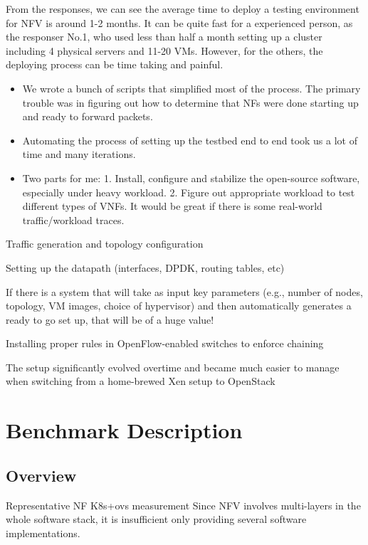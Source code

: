 \documentclass{sig-alternate-10pt}
\begin{document}
From the responses, we can see the average time 
to deploy a testing environment for NFV is around 1-2 months.
It can be quite fast for a experienced person, 
as the responser No.1, who used less than half a month 
setting up a cluster including 4 physical servers and 11-20 VMs. 
However, for the others, the deploying process 
can be time taking and painful.

\begin{itemize}
\item[]{}
We wrote a bunch of scripts that simplified most of the process. The primary trouble was in figuring out how to determine that NFs were done starting up and ready to forward packets.
\end{itemize}


\begin{itemize}
\item[]{}
Automating the process of setting up the testbed end to end took us a lot of time and many iterations.
\end{itemize}


\begin{itemize}
\item[]{}
Two parts for me:
1. Install, configure and stabilize the open-source software, especially under heavy workload.
2. Figure out appropriate workload to test different types of VNFs. It would be great if there is some real-world traffic/workload traces.
\end{itemize}

Traffic generation and topology configuration

Setting up the datapath (interfaces, DPDK, routing tables, etc)

If there is a system that will take as input key parameters (e.g., number of nodes, topology, VM images, choice of hypervisor) and then automatically generates a ready to go set up, that will be of a huge value!

Installing proper rules in OpenFlow-enabled switches to enforce chaining

The setup significantly evolved overtime and became much easier to manage when switching from a home-brewed Xen setup to OpenStack

\section{ Benchmark Description}
\subsection{Overview}
Representative NF
K8s+ovs
measurement
Since NFV involves multi-layers in the whole software stack, 
it is insufficient only providing several software implementations. 
\end{document}
